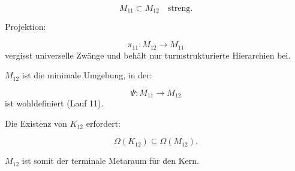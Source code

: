 \[
M_{11} \subset M_{12}
\quad\text{streng}.
\]

Projektion:

\[
\pi_{11}: M_{12} \to M_{11}
\]
vergisst universelle Zwänge und behält nur turmstrukturierte Hierarchien bei.

$M_{12}$ ist die minimale Umgebung, in der:

\[
\Psi: M_{11} \to M_{12}
\]
ist wohldefiniert (Lauf 11).

Die Existenz von $K_{12}$ erfordert:

\[
\Omega(K_{12}) \subseteq \Omega(M_{12}).
\]

$M_{12}$ ist somit der terminale Metaraum für den Kern.
